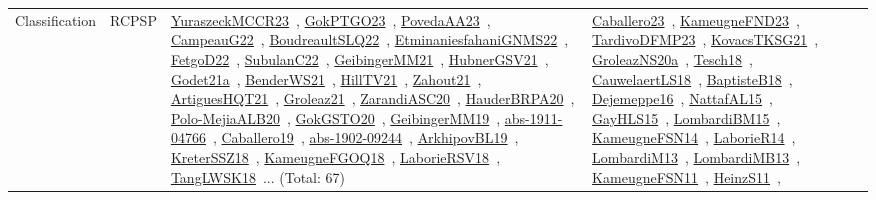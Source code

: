 {\begin{longtable}{lp{3cm}>{\raggedright\arraybackslash}p{6cm}>{\raggedright\arraybackslash}p{6cm}>{\raggedright\arraybackslash}p{8cm}}
Classification & RCPSP & \href{../works/YuraszeckMCCR23.pdf}{YuraszeckMCCR23}~\cite{YuraszeckMCCR23}, \href{../works/GokPTGO23.pdf}{GokPTGO23}~\cite{GokPTGO23}, \href{../works/PovedaAA23.pdf}{PovedaAA23}~\cite{PovedaAA23}, \href{../works/CampeauG22.pdf}{CampeauG22}~\cite{CampeauG22}, \href{../works/BoudreaultSLQ22.pdf}{BoudreaultSLQ22}~\cite{BoudreaultSLQ22}, \href{../works/EtminaniesfahaniGNMS22.pdf}{EtminaniesfahaniGNMS22}~\cite{EtminaniesfahaniGNMS22}, \href{../works/FetgoD22.pdf}{FetgoD22}~\cite{FetgoD22}, \href{../works/SubulanC22.pdf}{SubulanC22}~\cite{SubulanC22}, \href{../works/GeibingerMM21.pdf}{GeibingerMM21}~\cite{GeibingerMM21}, \href{../works/HubnerGSV21.pdf}{HubnerGSV21}~\cite{HubnerGSV21}, \href{../works/Godet21a.pdf}{Godet21a}~\cite{Godet21a}, \href{../works/BenderWS21.pdf}{BenderWS21}~\cite{BenderWS21}, \href{../works/HillTV21.pdf}{HillTV21}~\cite{HillTV21}, \href{../works/Zahout21.pdf}{Zahout21}~\cite{Zahout21}, \href{../works/ArtiguesHQT21.pdf}{ArtiguesHQT21}~\cite{ArtiguesHQT21}, \href{../works/Groleaz21.pdf}{Groleaz21}~\cite{Groleaz21}, \href{../works/ZarandiASC20.pdf}{ZarandiASC20}~\cite{ZarandiASC20}, \href{../works/HauderBRPA20.pdf}{HauderBRPA20}~\cite{HauderBRPA20}, \href{../works/Polo-MejiaALB20.pdf}{Polo-MejiaALB20}~\cite{Polo-MejiaALB20}, \href{../works/GokGSTO20.pdf}{GokGSTO20}~\cite{GokGSTO20}, \href{../works/GeibingerMM19.pdf}{GeibingerMM19}~\cite{GeibingerMM19}, \href{../works/abs-1911-04766.pdf}{abs-1911-04766}~\cite{abs-1911-04766}, \href{../works/Caballero19.pdf}{Caballero19}~\cite{Caballero19}, \href{../works/abs-1902-09244.pdf}{abs-1902-09244}~\cite{abs-1902-09244}, \href{../works/ArkhipovBL19.pdf}{ArkhipovBL19}~\cite{ArkhipovBL19}, \href{../works/KreterSSZ18.pdf}{KreterSSZ18}~\cite{KreterSSZ18}, \href{../works/KameugneFGOQ18.pdf}{KameugneFGOQ18}~\cite{KameugneFGOQ18}, \href{../works/LaborieRSV18.pdf}{LaborieRSV18}~\cite{LaborieRSV18}, \href{../works/TangLWSK18.pdf}{TangLWSK18}~\cite{TangLWSK18}... (Total: 67) & \href{../works/Caballero23.pdf}{Caballero23}~\cite{Caballero23}, \href{../works/KameugneFND23.pdf}{KameugneFND23}~\cite{KameugneFND23}, \href{../works/TardivoDFMP23.pdf}{TardivoDFMP23}~\cite{TardivoDFMP23}, \href{../works/KovacsTKSG21.pdf}{KovacsTKSG21}~\cite{KovacsTKSG21}, \href{../works/GroleazNS20a.pdf}{GroleazNS20a}~\cite{GroleazNS20a}, \href{../works/Tesch18.pdf}{Tesch18}~\cite{Tesch18}, \href{../works/CauwelaertLS18.pdf}{CauwelaertLS18}~\cite{CauwelaertLS18}, \href{../works/BaptisteB18.pdf}{BaptisteB18}~\cite{BaptisteB18}, \href{../works/Dejemeppe16.pdf}{Dejemeppe16}~\cite{Dejemeppe16}, \href{../works/NattafAL15.pdf}{NattafAL15}~\cite{NattafAL15}, \href{../works/GayHLS15.pdf}{GayHLS15}~\cite{GayHLS15}, \href{../works/LombardiBM15.pdf}{LombardiBM15}~\cite{LombardiBM15}, \href{../works/KameugneFSN14.pdf}{KameugneFSN14}~\cite{KameugneFSN14}, \href{../works/LaborieR14.pdf}{LaborieR14}~\cite{LaborieR14}, \href{../works/LombardiM13.pdf}{LombardiM13}~\cite{LombardiM13}, \href{../works/LombardiMB13.pdf}{LombardiMB13}~\cite{LombardiMB13}, \href{../works/KameugneFSN11.pdf}{KameugneFSN11}~\cite{KameugneFSN11}, \href{../works/HeinzS11.pdf}{HeinzS11}~\cite{HeinzS11}, 
\end{longtable}}
